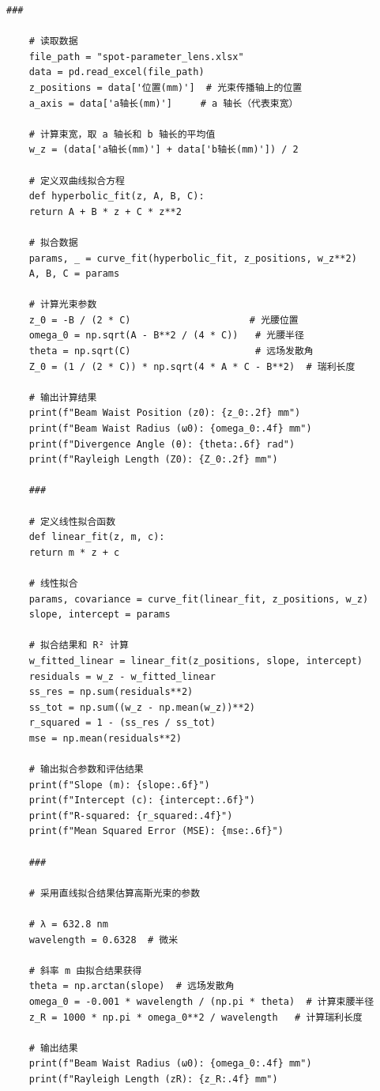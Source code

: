 \clearpage
\begin{lstlisting}[style=pythonstyle,caption=其它计算代码]
	###
	
	# 读取数据
	file_path = "spot-parameter_lens.xlsx"
	data = pd.read_excel(file_path)
	z_positions = data['位置(mm)']  # 光束传播轴上的位置
	a_axis = data['a轴长(mm)']     # a 轴长（代表束宽）
	
	# 计算束宽，取 a 轴长和 b 轴长的平均值
	w_z = (data['a轴长(mm)'] + data['b轴长(mm)']) / 2
	
	# 定义双曲线拟合方程
	def hyperbolic_fit(z, A, B, C):
	return A + B * z + C * z**2
	
	# 拟合数据
	params, _ = curve_fit(hyperbolic_fit, z_positions, w_z**2)
	A, B, C = params
	
	# 计算光束参数
	z_0 = -B / (2 * C)                     # 光腰位置
	omega_0 = np.sqrt(A - B**2 / (4 * C))   # 光腰半径
	theta = np.sqrt(C)                      # 远场发散角
	Z_0 = (1 / (2 * C)) * np.sqrt(4 * A * C - B**2)  # 瑞利长度
	
	# 输出计算结果
	print(f"Beam Waist Position (z0): {z_0:.2f} mm")
	print(f"Beam Waist Radius (ω0): {omega_0:.4f} mm")
	print(f"Divergence Angle (θ): {theta:.6f} rad")
	print(f"Rayleigh Length (Z0): {Z_0:.2f} mm")
	
	###
	
	# 定义线性拟合函数
	def linear_fit(z, m, c):
	return m * z + c
	
	# 线性拟合
	params, covariance = curve_fit(linear_fit, z_positions, w_z)
	slope, intercept = params
	
	# 拟合结果和 R² 计算
	w_fitted_linear = linear_fit(z_positions, slope, intercept)
	residuals = w_z - w_fitted_linear
	ss_res = np.sum(residuals**2)
	ss_tot = np.sum((w_z - np.mean(w_z))**2)
	r_squared = 1 - (ss_res / ss_tot)
	mse = np.mean(residuals**2)
	
	# 输出拟合参数和评估结果
	print(f"Slope (m): {slope:.6f}")
	print(f"Intercept (c): {intercept:.6f}")
	print(f"R-squared: {r_squared:.4f}")
	print(f"Mean Squared Error (MSE): {mse:.6f}")
	
	###
	
	# 采用直线拟合结果估算高斯光束的参数
	
	# λ = 632.8 nm
	wavelength = 0.6328  # 微米
	
	# 斜率 m 由拟合结果获得
	theta = np.arctan(slope)  # 远场发散角
	omega_0 = -0.001 * wavelength / (np.pi * theta)  # 计算束腰半径
	z_R = 1000 * np.pi * omega_0**2 / wavelength   # 计算瑞利长度
	
	# 输出结果
	print(f"Beam Waist Radius (ω0): {omega_0:.4f} mm")
	print(f"Rayleigh Length (zR): {z_R:.4f} mm")
	

\end{lstlisting}
